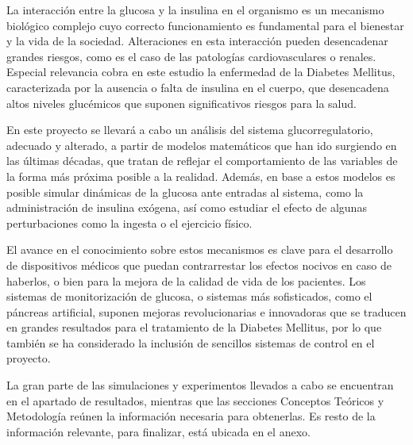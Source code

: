 

La interacción entre la glucosa y la insulina en el organismo es un mecanismo biológico complejo cuyo correcto funcionamiento es fundamental para el bienestar y la vida de la sociedad. Alteraciones en esta interacción pueden desencadenar grandes riesgos, como es el caso de las patologías cardiovasculares o renales. Especial relevancia cobra en este estudio la enfermedad de la Diabetes Mellitus, caracterizada por la ausencia o falta de insulina en el cuerpo, que desencadena altos niveles glucémicos que suponen significativos riesgos para la salud.

En este proyecto se llevará a cabo un análisis del sistema glucorregulatorio, adecuado y alterado, a partir de modelos matemáticos que han ido surgiendo en las últimas décadas, que tratan de reflejar el comportamiento de las variables de la forma más próxima posible a la realidad. Además, en base a estos modelos es posible simular dinámicas de la glucosa ante entradas al sistema, como la administración de insulina exógena, así como estudiar el efecto de algunas perturbaciones como la ingesta o el ejercicio físico.

El avance en el conocimiento sobre estos mecanismos es clave para el desarrollo de dispositivos médicos que puedan contrarrestar los efectos nocivos en caso de haberlos, o bien para la mejora de la calidad de vida de los pacientes. Los sistemas de monitorización de glucosa, o sistemas más sofisticados, como el páncreas artificial, suponen mejoras revolucionarias e innovadoras que se traducen en grandes resultados para el tratamiento de la Diabetes Mellitus, por lo que también se ha considerado la inclusión de sencillos sistemas de control en el proyecto.

La gran parte de las simulaciones y experimentos llevados a cabo se encuentran en el apartado de resultados, mientras que las secciones Conceptos Teóricos y Metodología reúnen la información necesaria para obtenerlas. Es resto de la información relevante, para finalizar, está ubicada en el anexo.




